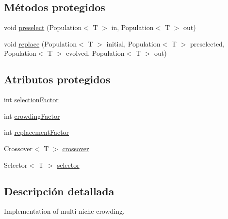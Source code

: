 \subsection*{Métodos protegidos}
\begin{DoxyCompactItemize}
\item 
void \hyperlink{classjenes_1_1stage_1_1operator_1_1common_1_1_multi_niche_crowder_3_01_t_01extends_01_chromosome_01_4_ae3e96b6cd96f375209e9308bb7f9ca85}{preselect} (Population$<$ T $>$ in, Population$<$ T $>$ out)
\item 
void \hyperlink{classjenes_1_1stage_1_1operator_1_1common_1_1_multi_niche_crowder_3_01_t_01extends_01_chromosome_01_4_a619884821dabf179aed435269366114e}{replace} (Population$<$ T $>$ initial, Population$<$ T $>$ preselected, Population$<$ T $>$ evolved, Population$<$ T $>$ out)
\end{DoxyCompactItemize}
\subsection*{Atributos protegidos}
\begin{DoxyCompactItemize}
\item 
int \hyperlink{classjenes_1_1stage_1_1operator_1_1common_1_1_multi_niche_crowder_3_01_t_01extends_01_chromosome_01_4_ab561927a8af185e69bd5fcf85e904d7a}{selection\-Factor}
\item 
int \hyperlink{classjenes_1_1stage_1_1operator_1_1common_1_1_multi_niche_crowder_3_01_t_01extends_01_chromosome_01_4_ad7320907a72bd19c028f922383667560}{crowding\-Factor}
\item 
int \hyperlink{classjenes_1_1stage_1_1operator_1_1common_1_1_multi_niche_crowder_3_01_t_01extends_01_chromosome_01_4_a9a068eae86d3af67f89cfa4b244810fb}{replacement\-Factor}
\item 
Crossover$<$ T $>$ \hyperlink{classjenes_1_1stage_1_1operator_1_1common_1_1_multi_niche_crowder_3_01_t_01extends_01_chromosome_01_4_ad584be099b23576ec3379a6867d31ef4}{crossover}
\item 
Selector$<$ T $>$ \hyperlink{classjenes_1_1stage_1_1operator_1_1common_1_1_multi_niche_crowder_3_01_t_01extends_01_chromosome_01_4_aec9f82fc79b7a63f5e664dfbcc7e9563}{selector}
\end{DoxyCompactItemize}


\subsection{Descripción detallada}
Implementation of multi-\/niche crowding.

